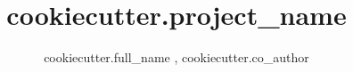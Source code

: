 \title{ {{ cookiecutter.project_name }} }

\author{ {{ cookiecutter.full_name }}, {{ cookiecutter.co_author }} }
\date{}

